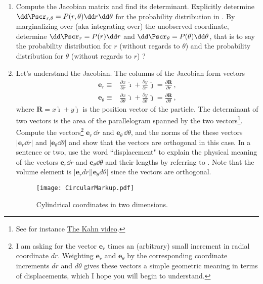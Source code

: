\documentclass[12pt]{article}
\begin{document}
      \begin{enumerate}
         \item  Compute the Jacobian matrix and find its determinant. Explicitly determine $\dd \Pscr_{r,\theta} = P(r,\theta) \dd r \dd\theta $ for the probability distribution in .  By marginalizing over (aka integrating over) the unobserved coordinate, determine 
            $\dd \Pscr_{r} =P(r) \dd r$ and $\dd \Pscr_\theta = P(\theta) \dd \theta$, that is to say the probability distribution for $r$ (without regards to $\theta$) and the probability distribution for $\theta$ (without regards to $r$) ?

        \item Let's understand the Jacobian. 
      The columns of the Jacobian form vectors
        \begin{align}
           {\bm e}_r  \equiv& \frac{\partial x}{\partial r} \, \hat {\bm\imath}   
             +  \frac{\partial y}{\partial r} \, \hat {\bm \jmath}  
             = \frac{\partial {\bm R}}{\partial r}  \, ,  \\
           {\bm e}_\theta \equiv&  \frac{\partial x}{\partial \theta} \, \hat {\bm \imath} +  \frac{\partial y}{\partial \theta} \, \hat {\bm \jmath} 
             = \frac{\partial {\bm R}}{\partial \theta}  \, , 
        \end{align}
        where ${\bm R} = x \hat{\bm \imath} + y \hat{\bm \jmath}$ is the position vector of the particle. 
        The determinant of two vectors is the area of the parallelogram spanned by the two vectors\footnote{See for instance \href{https://www.khanacademy.org/math/linear-algebra/matrix-transformations/determinant-depth/v/linear-algebra-determinant-and-area-of-a-parallelogram}{The Kahn video}. }.
        Compute the vectors\footnote{I am  asking  for the vector ${\bm e}_r$  times an (arbitrary) small increment in radial coordinate $dr$. Weighting ${\bm e}_r$ and ${\bm e_\theta}$ by the corresponding coordinate increments $dr$ and $d\theta$ gives these vectors a simple geometric meaning in terms of displacements, which I hope you will begin to understand.} ${\bm e}_r \, \dd r$ and ${\bm e}_\theta \,\dd\theta $, 
        and the norms of the these vectors $|{\bm e}_r \dd r|$ and 
        $|{\bm e}_\theta \dd\theta|$ and show that the vectors are orthogonal in this case. In a sentence or two, use the word ``displacement" to explain 
        the physical meaning of the vectors ${\bm e}_r \dd r$ and ${\bm e}_\theta \dd\theta$ and their lengths by referring to .   Note that the volume element is $|{\bm e}_r dr||{\bm e}_\theta d\theta|$ since the vectors are orthogonal.

    \begin{figure}
 \centering
 \texttt{[image: CircularMarkup.pdf]}
    \caption{ \label{CircularFig} 
    Cylindrical coordinates in two dimensions.
 }
       \end{figure}
       \end{enumerate}
\end{document}
